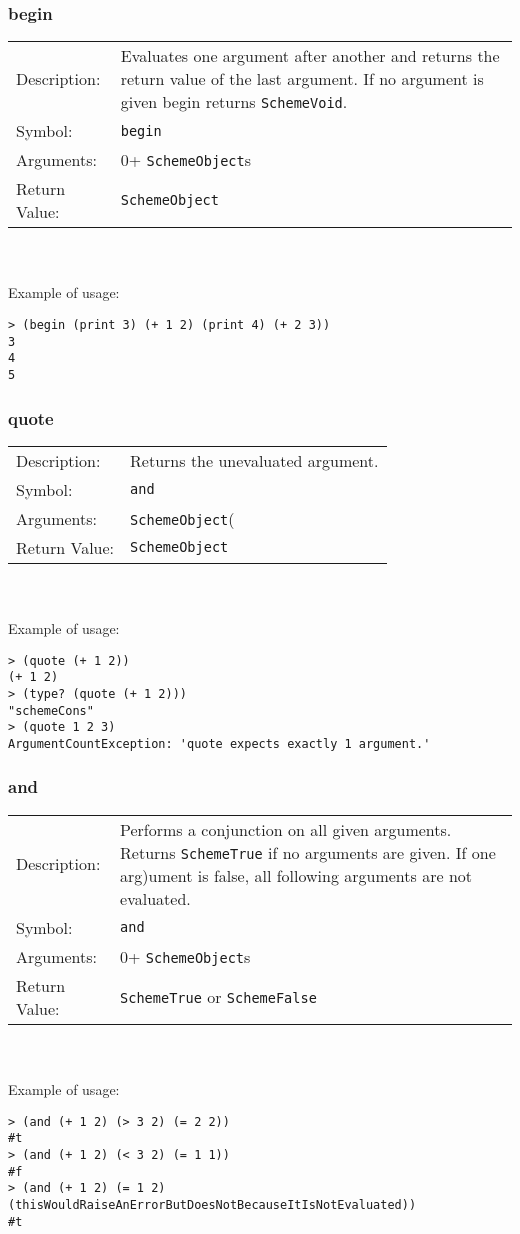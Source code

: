 \documentclass[12pt,a4paper]{scrartcl}
\begin{document}
\subsubsection*{begin}
\begin{tabular}{l  p{13cm}}
Description: & Evaluates one argument after another and returns the return value of the last argument. If no argument is given begin returns \lstinline{SchemeVoid}.\\
Symbol: & \lstinline{begin}\\
Arguments: & 0+ \lstinline{SchemeObject}s \\
Return Value: & \lstinline{SchemeObject} \\
\end{tabular}
\\
\\
Example of usage:
\begin{lstlisting}
> (begin (print 3) (+ 1 2) (print 4) (+ 2 3))
3
4
5
\end{lstlisting}


\subsubsection*{quote}
\begin{tabular}{l  p{13cm}}
Description: & Returns the unevaluated argument.\\
Symbol: & \lstinline{and}\\
Arguments: & \lstinline{SchemeObject}( \\
Return Value: & \lstinline{SchemeObject}\\
\end{tabular}
\\
\\
Example of usage:
\begin{lstlisting}
> (quote (+ 1 2))
(+ 1 2)
> (type? (quote (+ 1 2)))
"schemeCons"
> (quote 1 2 3)
ArgumentCountException: 'quote expects exactly 1 argument.' 
\end{lstlisting}

\subsubsection*{and}
\begin{tabular}{l  p{13cm}}
Description: & Performs a conjunction on all given arguments. Returns \lstinline{SchemeTrue} if no arguments are given. If one arg)ument is false, all following arguments are not evaluated. \\
Symbol: & \lstinline{and}\\
Arguments: & 0+ \lstinline{SchemeObject}s \\
Return Value: & \lstinline{SchemeTrue} or \lstinline{SchemeFalse}\\
\end{tabular}
\\
\\
Example of usage:
\begin{lstlisting}
> (and (+ 1 2) (> 3 2) (= 2 2))
#t
> (and (+ 1 2) (< 3 2) (= 1 1))
#f
> (and (+ 1 2) (= 1 2) (thisWouldRaiseAnErrorButDoesNotBecauseItIsNotEvaluated))
#t
\end{lstlisting}
\end{document}
